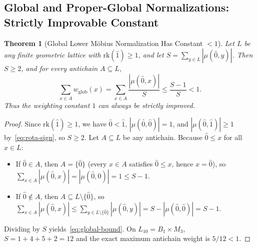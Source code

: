 \documentclass[11pt]{article}
\newtheorem{theorem}{Theorem}[section]
\theoremstyle{definition}
\theoremstyle{remark}
\newcommand{\rk}{\mathrm{rk}}
\begin{document}
\subsection{Global and Proper-Global Normalizations: Strictly Improvable Constant}

\begin{theorem}[Global Lower M\"obius Normalization Has Constant $< 1$]\label{thm:global}
Let $L$ be any finite geometric lattice with $\rk(\hat{1}) \ge 1$, and let $S = \sum_{y \in L} |\mu(\hat{0}, y)|$. Then $S \ge 2$, and for every antichain $A \subseteq L$,
\begin{equation}\label{eq:global-bound}
  \sum_{x \in A} w_{\mathrm{glob}}(x) = \sum_{x \in A} \frac{|\mu(\hat{0}, x)|}{S} \le \frac{S - 1}{S} < 1.
\end{equation}
Thus the weighting constant $1$ can \emph{always} be strictly improved.
\end{theorem}
\begin{proof}
Since $\rk(\hat{1}) \ge 1$, we have $\hat{0} < \hat{1}$, $|\mu(\hat{0}, \hat{0})| = 1$, and $|\mu(\hat{0}, \hat{1})| \ge 1$ by~\eqref{eq:rota-sign}, so $S \ge 2$. Let $A \subseteq L$ be any antichain. Because $\hat{0} \le x$ for all $x \in L$:
\begin{itemize}
\item If $\hat{0} \in A$, then $A = \{\hat{0}\}$ (every $x \in A$ satisfies $\hat{0} \le x$, hence $x = \hat{0}$), so $\sum_{x \in A} |\mu(\hat{0}, x)| = |\mu(\hat{0}, \hat{0})| = 1 \le S - 1$.
\item If $\hat{0} \notin A$, then $A \subseteq L \setminus \{\hat{0}\}$, so $\sum_{x \in A} |\mu(\hat{0}, x)| \le \sum_{y \in L \setminus \{\hat{0}\}} |\mu(\hat{0}, y)| = S - |\mu(\hat{0}, \hat{0})| = S - 1$.
\end{itemize}
Dividing by $S$ yields~\eqref{eq:global-bound}. On $L_{10} = B_1 \times M_3$, $S = 1 + 4 + 5 + 2 = 12$ and the exact maximum antichain weight is $5/12 < 1$.
\end{proof}
\end{document}
